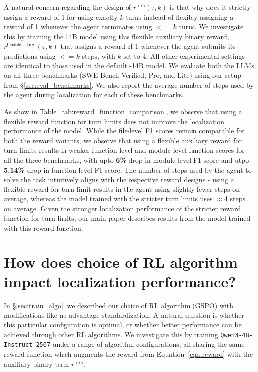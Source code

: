 A natural concern regarding the design of $r^{\mathsf{turn}}(\tau, k)$ is that why does it strictly assign a reward of 1 for using exactly $k$ turns instead of flexibly assigning a reward of 1 whenever the agent terminates using $<=k$ turns. We investigate this by training the 14B model using this flexible auxiliary binary reward,  $r^{\mathsf{flexible-turn}}(\tau, k)$ that assigns a reward of 1 whenever the agent submits its predictions using $<=k$ steps, with $k$ set to 4. All other experimental settings are identical to those used in the default \methodname-14B model. We evaluate both the LLMs on all three benchmarks (SWE-Bench Verified, Pro, and Lite) using our setup from \S\ref{sec:eval_benchmarks}. We also report the average number of steps used by the agent during localization for each of these benchmarks.

As show in Table~\ref{tab:reward_function_comparison}, we observe that using a flexible reward function for turn limits does not improve the localization performance of the model. While the file-level F1 scores remain comparable for both the reward variants, we observe that using a flexible auxiliary reward for turn limits results in weaker function-level and module-level function scores for all the three benchmarks, with upto \textbf{6\%} drop in module-level F1 score and utpo \textbf{5.14\%} drop in function-level F1 score. The number of steps used by the agent to solve the task intuitively aligns with the respective reward designs - using a flexible reward for turn limit results in the agent using slightly fewer steps on average, whereas the model trained with the stricter turn limits uses $\approx$4 steps on average. Given the stronger localization performance of the stricter reward function for turn limits, our main paper describes results from the model trained with this reward function.


\section{How does choice of RL algorithm impact localization performance?}\label{appendix:rl_ablation_study}



In \S\ref{sec:train_algo}, we described our choice of RL algorithm (GSPO) with modifications like no advantage standardization. A natural question is whether this particular configuration is optimal, or whether better performance can be achieved through other RL algorithms. We investigate this by training \texttt{Qwen3-4B-Instruct-2507} under a range of algorithm configurations, all sharing the same reward function which augments the reward from Equation~\ref{eqn:reward} with the auxiliary binary term $r^{\mathsf{turn}}$.

